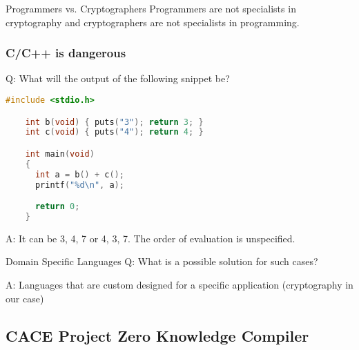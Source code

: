 \documentclass{beamer}
\begin{document}
\begin{frame}{Programmers vs. Cryptographers}
  Programmers are not specialists in cryptography and cryptographers
  are not specialists in programming.
\end{frame}

\begin{frame}[fragile]
  \frametitle{C/C++ is dangerous}
  Q: What will the output of the following snippet be?
  \begin{lstlisting}[language=C]
    #include <stdio.h>

    int b(void) { puts("3"); return 3; }
    int c(void) { puts("4"); return 4; }

    int main(void)
    {
      int a = b() + c();
      printf("%d\n", a);

      return 0;
    }
  \end{lstlisting}
  \pause
  A: It can be 3, 4, 7 or 4, 3, 7. The order of evaluation is unspecified.
\end{frame}

\begin{frame}{Domain Specific Languages}
  Q: What is a possible solution for such cases?

  \pause

  A: Languages that are custom designed for a specific application
  (cryptography in our case)
\end{frame}

\subsection{CACE Project Zero Knowledge Compiler}
\end{document}
